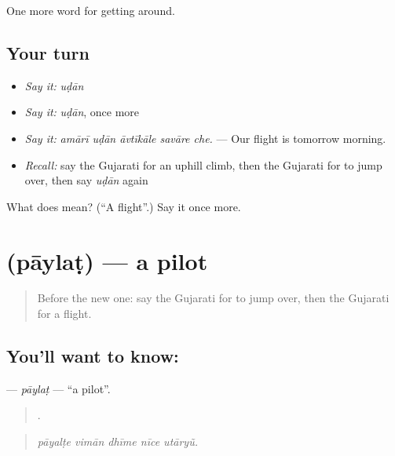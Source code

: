 \begin{grammarlens}[title={What you've built}]
One more word for getting around.
\end{grammarlens}

\subsection*{Your turn}
\begin{itemize}
\raggedright
  \item \emph{Say it:} \emph{uḍān}
  \item \emph{Say it:} \emph{uḍān}, once more
  \item \emph{Say it:} \emph{amārī uḍān āvtīkāle savāre che.} — Our flight is tomorrow morning.
  \item \emph{Recall:} say the Gujarati for an uphill climb, then the Gujarati for to jump over, then say \emph{uḍān} again
\end{itemize}

\begin{tcolorbox}[breakable,colback=teal!4,colframe=teal!35!black,title={Before you move on}]
What does  mean? (\textquotedblleft{}A flight\textquotedblright{}.) Say it once more.
\end{tcolorbox}
\section[\texorpdfstring{\gu{પાયલટ} (pāylaṭ)}{પાયલટ (pāylaṭ)}]{ (pāylaṭ) — a pilot}

\label{lesson:GU-C405-paylat}



\begin{quote}
Before the new one: say the Gujarati for to jump over, then the Gujarati for a flight.
\end{quote}

\subsection*{You'll want to know: }
\textbf{} — \emph{pāylaṭ} — \textquotedblleft{}a pilot\textquotedblright{}.

\begin{quote}
    .
\end{quote}

\begin{quote}
\emph{pāyalṭe vimān dhīme nīce utāryũ.}
\end{quote}

